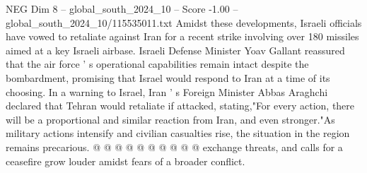 \begin{textsample}{NEG Dim 8 – global\_south\_2024\_10 – Score -1.00 – global\_south\_2024\_10/115535011.txt}
Amidst these developments, Israeli officials have vowed to retaliate against Iran for a recent strike involving over 180 missiles aimed at a key Israeli airbase.
Israeli Defense Minister Yoav Gallant reassured that the air force ' s operational capabilities remain intact despite the bombardment, promising that Israel would respond to Iran at a time of its choosing.
In a warning to Israel, Iran ' s Foreign Minister Abbas Araghchi declared that Tehran would retaliate if attacked, stating,"For every action, there will be a proportional and similar reaction from Iran, and even stronger."As military actions intensify and civilian casualties rise, the situation in the region remains precarious. @ @ @ @ @ @ @ @ @ @ exchange threats, and calls for a ceasefire grow louder amidst fears of a broader conflict.

\end{textsample}
